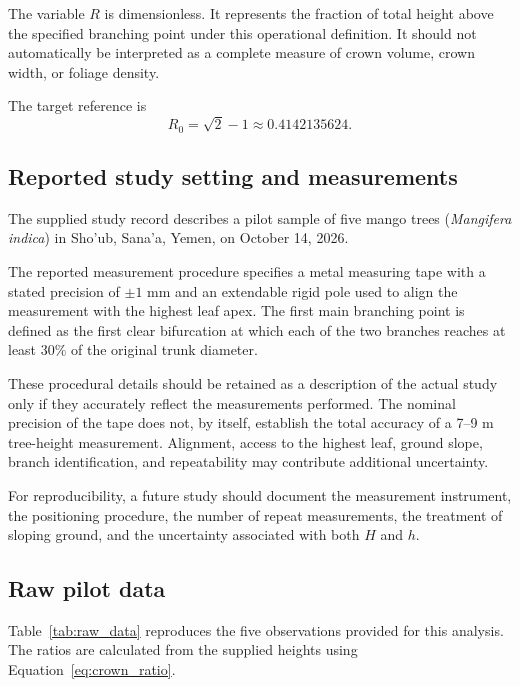 \documentclass[11pt,a4paper]{article}
\begin{document}
The variable \(R\) is dimensionless. It represents the fraction
of total height above the specified branching point under this
operational definition. It should not automatically be
interpreted as a complete measure of crown volume, crown width,
or foliage density.

The target reference is
\begin{equation}
    R_0=\sqrt{2}-1\approx0.4142135624.
    \label{eq:target}
\end{equation}

\subsection{Reported study setting and measurements}

The supplied study record describes a pilot sample of five
mango trees (\textit{Mangifera indica}) in Sho'ub, Sana'a,
Yemen, on October 14, 2026.

The reported measurement procedure specifies a metal measuring
tape with a stated precision of \(\pm1\) mm and an extendable
rigid pole used to align the measurement with the highest
leaf apex. The first main branching point is defined as the
first clear bifurcation at which each of the two branches
reaches at least \(30\%\) of the original trunk diameter.

These procedural details should be retained as a description
of the actual study only if they accurately reflect the
measurements performed. The nominal precision of the tape
does not, by itself, establish the total accuracy of a
7--9 m tree-height measurement. Alignment, access to the
highest leaf, ground slope, branch identification, and
repeatability may contribute additional uncertainty.

For reproducibility, a future study should document the
measurement instrument, the positioning procedure, the
number of repeat measurements, the treatment of sloping
ground, and the uncertainty associated with both \(H\) and \(h\).

\subsection{Raw pilot data}

Table~\ref{tab:raw_data} reproduces the five observations
provided for this analysis. The ratios are calculated from
the supplied heights using Equation~\eqref{eq:crown_ratio}.
\end{document}
